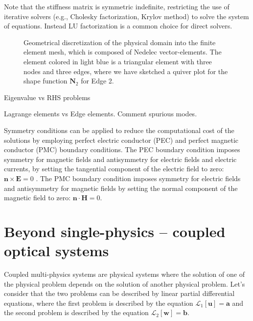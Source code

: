 Note that the stiffness matrix is symmetric indefinite, restricting the use of iterative solvers (e.g., Cholesky factorization, Krylov method) to solve the system of equations. Instead LU factorization is a common choice for direct solvers.
\begin{figure}[tb]
    \centering
    \caption{Geometrical discretization of the physical domain into the finite element mesh, which is composed of Nedelec vector-elements. The element colored in light blue is a triangular element with three nodes and three edges, where we have sketched a quiver plot for the shape function $\mathbf{N}_2$ for Edge 2.}
    \label{fig:fem}
\end{figure}

Eigenvalue vs RHS problems


Lagrange elements vs Edge elements. Comment spurious modes.

Symmetry conditions can be applied to reduce the computational
cost of the solutions by employing perfect electric conductor (PEC) and perfect magnetic 
conductor (PMC) boundary conditions. The PEC boundary condition
imposes symmetry for magnetic fields and antisymmetry for electric fields and electric 
currents, by setting the tangential component of the electric field to zero: $\mathbf{n}\times \mathbf{E} = 0$ .
The PMC boundary condition imposes symmetry for electric fields and antisymmetry for magnetic fields
by setting the normal component of the magnetic field to zero: $\mathbf{n}\cdot \mathbf{H} = 0$.

\section{Beyond single-physics -- coupled optical systems}

Coupled multi-physics systems are physical systems where the solution of one of the physical 
problem depends on the solution of another physical problem. Let's consider that the two
problems can be described by linear partial differential equations, where the first problem
is described by the equation $\mathcal{L}_1 [\mathbf{u}]= \mathbf{a}$ and the second problem is described by the 
equation $\mathcal{L}_2 [\mathbf{w}]= \mathbf{b}$.


